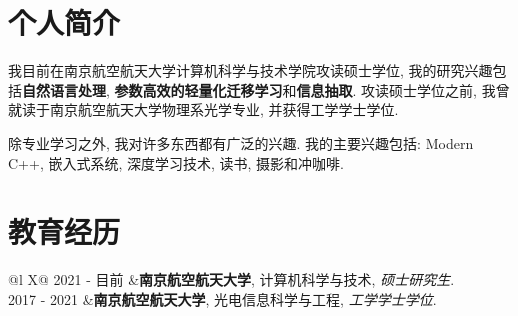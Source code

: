 \documentclass[a4paper,12pt]{article}
\begin{document}
\pagestyle{empty}
\begin{CJK*}{UTF8}{gbsn}





\section{个人简介}
我目前在南京航空航天大学计算机科学与技术学院攻读硕士学位, 我的研究兴趣包括\textbf{自然语言处理}, \textbf{参数高效的轻量化迁移学习}和\textbf{信息抽取}.
攻读硕士学位之前, 我曾就读于南京航空航天大学物理系光学专业, 并获得工学学士学位.

除专业学习之外, 我对许多东西都有广泛的兴趣. 我的主要兴趣包括: Modern C++, 嵌入式系统, 深度学习技术, 读书, 摄影和冲咖啡.
\section{教育经历}
\begin{tabularx}{\linewidth}{@{}l X@{}}	
2021 - 目前 &\textbf{南京航空航天大学}, 计算机科学与技术, \textit{硕士研究生}.\\
2017 - 2021 &\textbf{南京航空航天大学}, 光电信息科学与工程, \textit{工学学士学位}.\\
\end{tabularx}


\end{CJK*}
\end{document}
